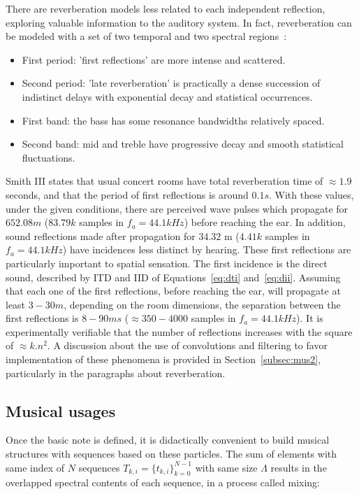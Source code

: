 There are reverberation models less related to each independent reflection, exploring valuable information to the auditory system. In fact, reverberation can be modeled with a set of two temporal and two spectral regions~\cite{JOSPhy}:
\begin{itemize}
   \item First period: 'first reflections' are more intense and scattered.
   \item Second period: 'late reverberation' is practically a dense succession of indistinct delays with exponential decay and statistical occurrences.
   \item First band: the bass has some resonance bandwidths relatively spaced.
   \item Second band: mid and treble have progressive decay and smooth statistical fluctuations.
\end{itemize}

Smith III states that usual concert rooms have total reverberation time of $\approx 1.9$ seconds, and that the period of first reflections is around $0.1s$. With these values, under the given conditions, there are perceived wave pulses which propagate for $652.08m$ ($83.79k$ samples in $f_a=44.1kHz$) before reaching the ear. In addition, sound reflections made after propagation for $34.32$ m ($4.41k$ samples in $f_a=44.1kHz$) have incidences less distinct by hearing. These first reflections are particularly important to spatial sensation. The first incidence is the direct sound, described by ITD and IID of Equations~\ref{eq:dti} and~\ref{eq:dii}. Assuming that each one of the first reflections, before reaching the ear, will propagate at least $3-30m$, depending on the room dimensions, the separation between the first reflections is $8-90ms$ ($\approx 350-4000$ samples in $f_a=44.1kHz$). It is experimentally verifiable that the number of reflections increases with the square of $\approx k.n^2$. A discussion about the use of convolutions and filtering to favor implementation of these phenomena is provided in Section~\ref{subsec:mus2}, particularly in the paragraphs about reverberation.

\subsection{Musical usages}\label{subsec:basMus}
Once the basic note is defined, it is didactically convenient to build musical structures with sequences based on these particles. The sum of elements with same index of $N$ sequences $T_{k,i}=\{t_{k,i}\}_{k=0}^{N-1}$ with same size $\Lambda$ results in the overlapped spectral contents of each sequence, in a process called mixing:


